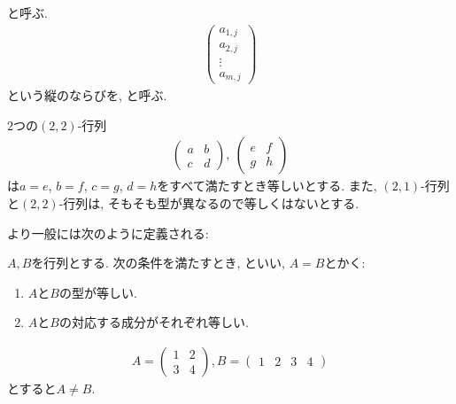 \begin{definition}
  と呼ぶ.
  \begin{align*}
    \begin{pmatrix}
      a_{1,j}\\
      a_{2,j}\\
      \vdots\\
      a_{m,j}
    \end{pmatrix}
  \end{align*}
  という縦のならびを,
  と呼ぶ.
\end{definition}

$2$つの$(2,2)$-行列
\begin{align*}
  \begin{pmatrix}
    a&b\\c&d
  \end{pmatrix},\ 
  \begin{pmatrix}
    e&f\\g&h
  \end{pmatrix}
\end{align*}
は$a=e$, $b=f$, $c=g$, $d=h$をすべて満たすとき等しいとする.
また, $(2,1)$-行列と$(2,2)$-行列は,
そもそも型が異なるので等しくはないとする.

より一般には次のように定義される:
\begin{definition}
  \label{def:matrix:eq}
  $A,B$を行列とする.
  次の条件を満たすとき,
  といい, $A=B$とかく:
  \begin{enumerate}
  \item $A$と$B$の型が等しい.
  \item $A$と$B$の対応する成分がそれぞれ等しい.
  \end{enumerate}
\end{definition}

\begin{example}
  \begin{align*}
    A=
    \begin{pmatrix}
      1&2\\
      3&4
    \end{pmatrix},
    B=
    \begin{pmatrix}
      1&2&
      3&4
    \end{pmatrix}
  \end{align*}
  とすると$A\neq B$.
\end{example}

